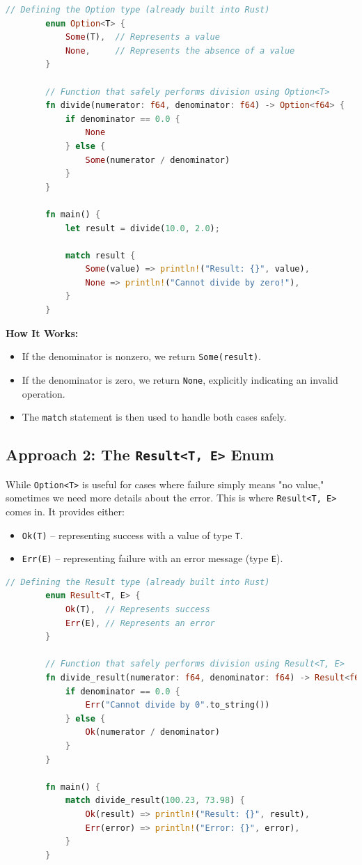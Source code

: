 \documentclass[a4paper,12pt]{report}
\begin{document}
	\begin{lstlisting}[language=Rust]
		// Defining the Option type (already built into Rust)
		enum Option<T> {  
			Some(T),  // Represents a value
			None,     // Represents the absence of a value
		}
		
		// Function that safely performs division using Option<T>
		fn divide(numerator: f64, denominator: f64) -> Option<f64> {
			if denominator == 0.0 {
				None
			} else {
				Some(numerator / denominator)
			}
		}
		
		fn main() {
			let result = divide(10.0, 2.0);
			
			match result {
				Some(value) => println!("Result: {}", value),
				None => println!("Cannot divide by zero!"),
			}
		}
	\end{lstlisting}
	
	\textbf{How It Works:}
	\begin{itemize}
		\item If the denominator is nonzero, we return \texttt{Some(result)}.
		\item If the denominator is zero, we return \texttt{None}, explicitly indicating an invalid operation.
		\item The \texttt{match} statement is then used to handle both cases safely.
	\end{itemize}
	
	\subsection*{Approach 2: The \texttt{Result<T, E>} Enum}
	
	While \texttt{Option<T>} is useful for cases where failure simply means "no value," sometimes we need more details about the error. This is where \texttt{Result<T, E>} comes in. It provides either:
	\begin{itemize}
		\item \texttt{Ok(T)} – representing success with a value of type \texttt{T}.
		\item \texttt{Err(E)} – representing failure with an error message (type \texttt{E}).
	\end{itemize}
	
	\begin{lstlisting}[language=Rust]
		// Defining the Result type (already built into Rust)
		enum Result<T, E> {
			Ok(T),  // Represents success
			Err(E), // Represents an error
		}
		
		// Function that safely performs division using Result<T, E>
		fn divide_result(numerator: f64, denominator: f64) -> Result<f64, String> {
			if denominator == 0.0 {
				Err("Cannot divide by 0".to_string())
			} else {
				Ok(numerator / denominator)
			}
		}
		
		fn main() {
			match divide_result(100.23, 73.98) {
				Ok(result) => println!("Result: {}", result),
				Err(error) => println!("Error: {}", error),
			}
		}
	\end{lstlisting}
	
\end{document}
